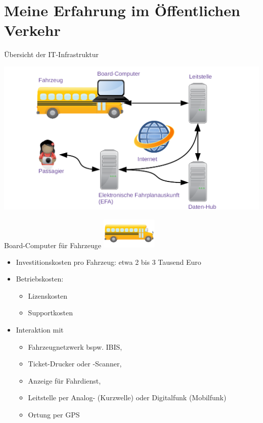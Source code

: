 
\section{Meine Erfahrung im Öffentlichen Verkehr}

\begin{frame}{Übersicht der IT-Infrastruktur}
  \begin{center}
    \includegraphics[width=1.1\textwidth]{otm-june-2-2021/public-transport-05-04-2021.png}
  \end{center}
\end{frame}

\begin{frame}{Board-Computer für Fahrzeuge}
  \includegraphics[width=0.2\textwidth]{otm-june-2-2021/bus.png}
  \begin{itemize}
  \item Investitionskosten pro Fahrzeug: etwa 2 bis 3 Tausend Euro
  \item Betriebskosten:
    \begin{itemize}
    \item Lizenskosten
    \item Supportkosten
    \end{itemize}
  \item Interaktion mit
    \begin{itemize}
    \item Fahrzeugnetzwerk bspw. IBIS,
    \item Ticket-Drucker oder -Scanner,
    \item Anzeige für Fahrdienst,
    \item Leitstelle per Analog- (Kurzwelle) oder Digitalfunk (Mobilfunk)
    \item Ortung per GPS
    \end{itemize}
  \end{itemize}
\end{frame}

